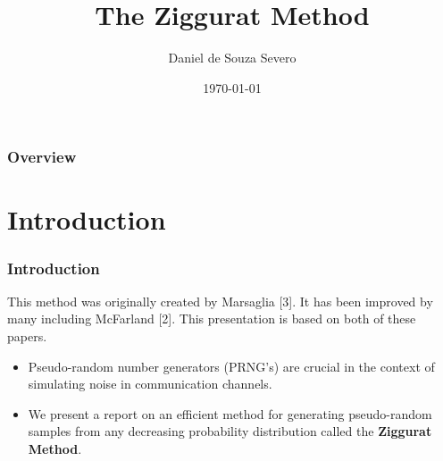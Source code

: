 \documentclass{beamer}
\title[The Ziggurat Method]{The Ziggurat Method} %
\author{Daniel de Souza Severo}
\institute[UofT]
{
University of Toronto\\ %
\medskip
\textit{danielsouzasevero@gmail.com} %
}
\date{\today}
\begin{document}
\begin{frame}
\titlepage %
\end{frame}

\begin{frame}
\frametitle{Overview} %
\tableofcontents %
\end{frame}

\section{Introduction}
	\begin{frame} 
		\frametitle{Introduction} 
		This method was originally created by Marsaglia [3]. It has been improved by many including McFarland [2]. This presentation is based on both of these papers.
		\begin{itemize}
			\item Pseudo-random number generators (PRNG’s) are crucial in the context of simulating noise in communication channels.
			\item We present a report on an efficient method for generating pseudo-random samples
from any decreasing probability distribution called the \textbf{Ziggurat Method}.
		\end{itemize}
	\end{frame}
\end{document}
